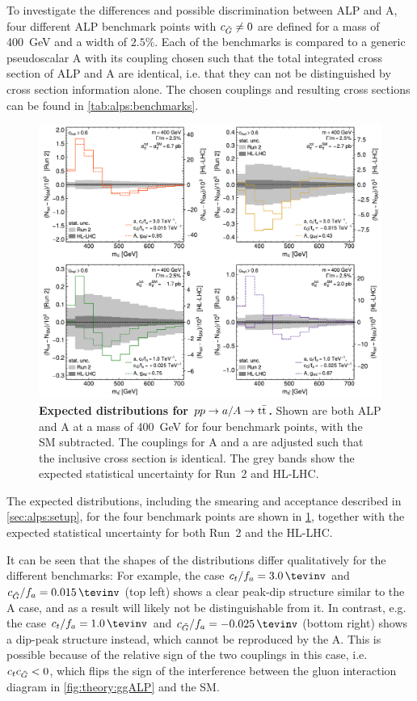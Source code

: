 To investigate the differences and possible discrimination between ALP and A, four different ALP benchmark points with $c_{\tilde{G}} \neq 0$ are defined for a mass of \SI{400}{\GeV} and a width of $2.5\%$. Each of the benchmarks is compared to a generic pseudoscalar A with its coupling \gAtt chosen such that the total integrated cross section of ALP and A are identical, i.e. that they can not be distinguished by cross section information alone. The chosen couplings and resulting cross sections can be found in \cref{tab:alps:benchmarks}.

\begin{figure}[t]
    \centering
    \includegraphics[width=0.99\linewidth]{figures/alps/mttplots.pdf}
    \caption{\textbf{Expected \mtt distributions for $pp \rightarrow a/A \rightarrow \mathrm{t \bar{t}}$.} Shown are both ALP and A at a mass of \SI{400}{\GeV} for four benchmark points, with the SM subtracted. The couplings for A and a are adjusted such that the inclusive cross section is identical. The grey bands show the expected statistical uncertainty for Run~2 and HL-LHC.}
    \label{fig:alps:mttplots}
\end{figure}

The expected \mtt distributions, including the smearing and acceptance described in \cref{sec:alps:setup}, for the four benchmark points are shown in \cref{fig:alps:mttplots}, together with the expected statistical uncertainty for both Run~2 and the HL-LHC. 

It can be seen that the shapes of the distributions differ qualitatively for the different benchmarks: For example, the case $\ct/f_a = \SI{3.0}{\tevinv}$ and $\cG/f_a = \SI{+0.015}{\tevinv}$ (top left) shows a clear peak-dip structure similar to the A case, and as a result will likely not be distinguishable from it. In contrast, e.g. the case $\ct/f_a = \SI{1.0}{\tevinv}$ and $\cG/f_a = \SI{-0.025}{\tevinv}$ (bottom right) shows a dip-peak structure instead, which cannot be reproduced by the A. This is possible because of the relative sign of the two couplings in this case, i.e. $c_t c_{\tilde{G}} < 0$, which flips the sign of the interference between the gluon interaction diagram in \cref{fig:theory:ggALP} and the SM. 

